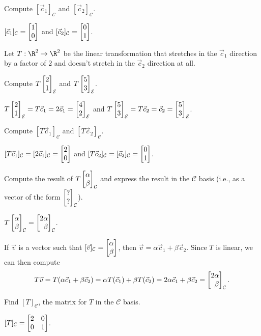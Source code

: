 \documentclass{problemset}
\begin{document}
	\begin{parts}
		\item Compute $[\vec c_1]_{\mathcal C}$ and $[\vec c_2]_{\mathcal C}$.
			\begin{solution}[inline]
				$[\vec c_1]_{\mathcal C}=\mat{1\\0}$ and
				$[\vec c_2]_{\mathcal C}=\mat{0\\1}$.
			\end{solution}
	\end{parts}
	Let $T:\R^2\to\R^2$ be the linear transformation that stretches in the $\vec c_1$ direction by a factor of $2$
	and doesn't stretch in the $\vec c_2$ direction at all.
	\begin{parts}[resume]
		\item Compute $T\mat{2\\1}_{\mathcal E}$ and $T\mat{5\\3}_{\mathcal E}$.
			\begin{solution}[inline]
				$T\mat{2\\1}_{\mathcal E}=T\vec c_1=2\vec c_1=\mat{4\\2}_{\mathcal E}$ and
				$T\mat{5\\3}_{\mathcal E}=T\vec c_2=\vec c_2=\mat{5\\3}_{\mathcal E}$.
			\end{solution}
		\item Compute $[T\vec c_1]_{\mathcal C}$ and $[T\vec c_2]_{\mathcal C}$.
			\begin{solution}[inline]
				$[T\vec c_1]_{\mathcal C}=[2\vec c_1]_{\mathcal C}=\mat{2\\0}$ and
				$[T\vec c_2]_{\mathcal C}=[\vec c_2]_{\mathcal C}=\mat{0\\1}$.
			\end{solution}
		\item Compute the result of $T\mat{\alpha\\\beta}_{\mathcal C}$ and express the result in the
			$\mathcal C$ basis (i.e., as a vector of the form $\mat{?\\?}_{\mathcal C}$).
			\begin{solution}
				$T\mat{\alpha\\\beta}_{\mathcal C}=\mat{2\alpha\\\beta}_{\mathcal C}$.

				If $\vec v$ is a vector such that
				$[\vec v]_{\mathcal C}=\mat{\alpha\\\beta}$, then
				$\vec v=\alpha\vec c_1+\beta\vec c_2$. Since $T$ is linear, we can
				then compute
				\[
					T\vec v
					=T(\alpha\vec c_1+\beta\vec c_2)
					=\alpha T(\vec c_1)+\beta T(\vec c_2)
					=2\alpha\vec c_1+\beta\vec c_2
					=\mat{2\alpha\\\beta}_{\mathcal C}.
				\]
			\end{solution}
		\item Find $[T]_{\mathcal C}$, the matrix for $T$ in the $\mathcal C$ basis.
			\begin{solution}
				$[T]_{\mathcal C}=\mat{2&0\\0&1}$.


\end{solution}
\end{parts}
\end{document}
